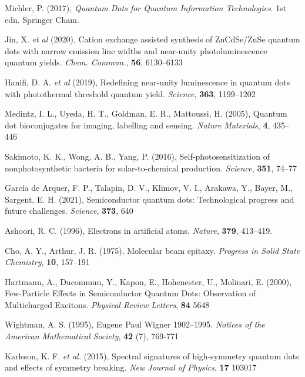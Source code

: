 \documentclass[12pt]{article}
\begin{document}
\begin{thebibliography}{10}

Michler, P. (2017), \textit{Quantum Dots for Quantum Information Technologies}. 1st edn. Springer Cham.

Jin, X. \textit{et al} (2020), Cation exchange assisted synthesis of ZnCdSe/ZnSe quantum dots with narrow emission line widths and near-unity photoluminescence quantum yields. \textit{Chem. Commun.}, \textbf{56}, 6130--6133

Hanifi, D. A. \textit{et al} (2019), Redefining near-unity luminescence in quantum dots with photothermal threshold quantum yield. \textit{Science}, \textbf{363}, 1199--1202

Medintz, I. L., Uyeda, H. T., Goldman, E. R., Mattoussi, H. (2005),
Quantum dot bioconjugates for imaging, labelling and sensing. \textit{Nature Materials}, \textbf{4}, 435--446

Sakimoto, K. K., Wong, A. B., Yang, P. (2016), Self-photosensitization
of nonphotosynthetic bacteria for solar-to-chemical production. \textit{Science}, \textbf{351}, 74--77

García de Arquer, F. P., Talapin, D. V., Klimov, V. I., Arakawa, Y., Bayer, M., Sargent, E. H. (2021), Semiconductor quantum dots: Technological progress and future challenges. \textit{Science}, \textbf{373}, 640 

Ashoori, R. C. (1996), Electrons in artificial atoms. \textit{Nature}, \textbf{379}, 413--419.

Cho, A. Y., Arthur, J. R. (1975), Molecular beam epitaxy. \textit{Progress in Solid State Chemistry}, \textbf{10}, 157--191

Hartmann, A., Ducommun, Y., Kapon, E., Hohenester, U., Molinari, E. (2000), Few-Particle Effects in Semiconductor Quantum Dots: Observation of Multicharged Excitons. \textit{Physical Review Letters}, \textbf{84} 5648

Wightman, A. S. (1995), Eugene Paul Wigner 1902--1995. \textit{Notices of the American Mathematical Society}, \textbf{42} (7), 769-771

Karlsson, K. F. \textit{et al.} (2015), Spectral signatures of high-symmetry quantum dots and effects of symmetry breaking. \textit{New Journal of Physics}, \textbf{17} 103017


\end{thebibliography}
\end{document}
